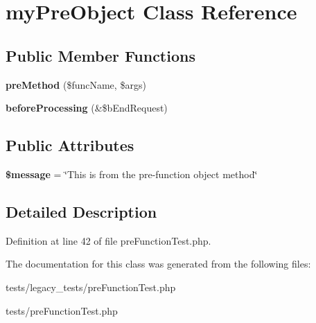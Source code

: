\hypertarget{classmyPreObject}{
\section{myPreObject Class Reference}
\label{classmyPreObject}
}
\subsection*{Public Member Functions}
\begin{DoxyCompactItemize}
\item 
\hypertarget{classmyPreObject_afb35ee23a9e2315d81d8960c8b163a38}{
{\bfseries preMethod} (\$funcName, \$args)}
\label{classmyPreObject_afb35ee23a9e2315d81d8960c8b163a38}

\item 
\hypertarget{classmyPreObject_ab2f7b8f8f960e96d87e64b3c2eb1a906}{
{\bfseries beforeProcessing} (\&\$bEndRequest)}
\label{classmyPreObject_ab2f7b8f8f960e96d87e64b3c2eb1a906}

\end{DoxyCompactItemize}
\subsection*{Public Attributes}
\begin{DoxyCompactItemize}
\item 
\hypertarget{classmyPreObject_adf014cc67a12e447b6a324270ac4a3fb}{
{\bfseries \$message} = \char`\"{}This is from the pre-\/function object method\char`\"{}}
\label{classmyPreObject_adf014cc67a12e447b6a324270ac4a3fb}

\end{DoxyCompactItemize}


\subsection{Detailed Description}


Definition at line 42 of file preFunctionTest.php.



The documentation for this class was generated from the following files:\begin{DoxyCompactItemize}
\item 
tests/legacy\_\-tests/preFunctionTest.php\item 
tests/preFunctionTest.php\end{DoxyCompactItemize}
